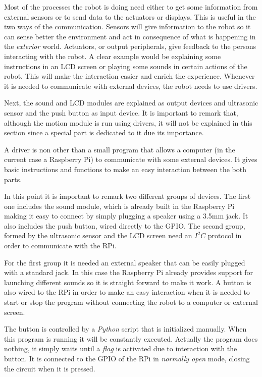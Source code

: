 Most of the processes the robot is doing need either to get some information from external sensors or to send data to the actuators or displays. This is useful in the two ways of the communication. Sensors will give information to the robot so it can sense better the environment and act in consequence of what is happening in the \textit{exterior} world. Actuators, or output peripherals, give feedback to the persons interacting with the robot. A clear example would be explaining some instructions in an LCD screen or playing some sounds in certain actions of the robot. This will make the interaction easier and enrich the experience. Whenever it is needed to communicate with external devices, the robot needs to use drivers.

Next, the sound and LCD modules are explained as output devices and ultrasonic sensor and the push button as input device. It is important to remark that, although the motion module is run using drivers, it will not be explained in this section since a special part is dedicated to it due its importance.

A driver is non other than a small program that allows a computer (in the current case a Raspberry Pi) to communicate with some external devices. It gives basic instructions and functions to make an easy interaction between the both parts.

In this point it is important to remark two different groups of devices. The first one includes the sound module, which is already built in the Raspberry Pi making it easy to connect by simply plugging a speaker using a 3.5mm jack. It also includes the push button, wired directly to the GPIO. The second group, formed by the ultrasonic sensor and the LCD screen need an $I^{2}C$ protocol in order to communicate with the RPi.

For the first group it is needed an external speaker that can be easily plugged with a standard jack. In this case the Raspberry Pi already provides support for launching different sounds so it is straight forward to make it work. A button is also wired to the RPi in order to make an easy interaction when it is needed to start or stop the program without connecting the robot to a computer or external screen. 

The button is controlled by a \textit{Python} script that is initialized manually. When this program is running it will be constantly executed. Actually the program does nothing, it simply waits until a \textit{flag} is activated due to interaction with the button. It is connected to the GPIO of the RPi in \textit{normally open} mode, closing the circuit when it is pressed.

